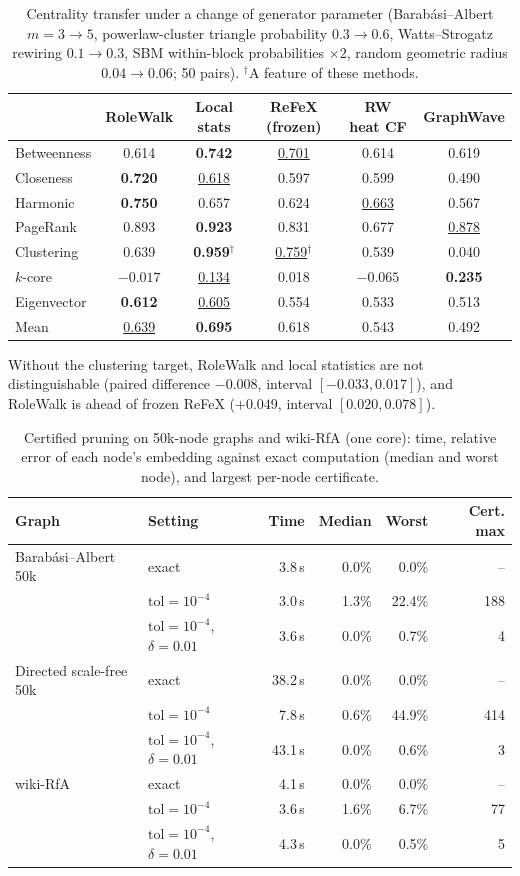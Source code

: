 \documentclass[10pt]{article}
\theoremstyle{definition}
\newcommand{\tol}{\mathrm{tol}}
\newcommand{\best}[1]{\textbf{#1}}
\newcommand{\second}[1]{\underline{#1}}
\begin{document}
\begin{table}[!ht]
\centering
\caption{Centrality transfer under a change of generator parameter (Barabási--Albert $m=3\to5$, powerlaw-cluster triangle probability $0.3\to0.6$, Watts--Strogatz rewiring $0.1\to0.3$, SBM within-block probabilities $\times2$, random geometric radius $0.04\to0.06$; 50 pairs). $^\dagger$A feature of these methods.}
\small
\begin{tabular}{lccccc}
\toprule
& RoleWalk & Local stats & ReFeX (frozen) & RW heat CF & GraphWave \\
\midrule
Betweenness & 0.614 & \best{0.742} & \second{0.701} & 0.614 & 0.619 \\
Closeness & \best{0.720} & \second{0.618} & 0.597 & 0.599 & 0.490 \\
Harmonic & \best{0.750} & 0.657 & 0.624 & \second{0.663} & 0.567 \\
PageRank & 0.893 & \best{0.923} & 0.831 & 0.677 & \second{0.878} \\
Clustering & 0.639 & \best{0.959}$^\dagger$ & \second{0.759}$^\dagger$ & 0.539 & 0.040 \\
$k$-core & $-0.017$ & \second{0.134} & 0.018 & $-0.065$ & \best{0.235} \\
Eigenvector & \best{0.612} & \second{0.605} & 0.554 & 0.533 & 0.513 \\
\midrule
Mean & \second{0.639} & \best{0.695} & 0.618 & 0.543 & 0.492 \\
\bottomrule
\end{tabular}
\end{table}
Without the clustering target, RoleWalk and local statistics are not distinguishable (paired difference $-0.008$, interval $[-0.033, 0.017]$), and RoleWalk is ahead of frozen ReFeX ($+0.049$, interval $[0.020, 0.078]$).

\begin{table}[!ht]
\centering
\caption{Certified pruning on 50k-node graphs and wiki-RfA (one core): time, relative error of each node's embedding against exact computation (median and worst node), and largest per-node certificate.}
\small
\begin{tabular}{llrrrr}
\toprule
Graph & Setting & Time & Median & Worst & Cert. max \\
\midrule
Barabási--Albert 50k & exact & 3.8\,s & 0.0\% & 0.0\% & -- \\
 & $\tol=10^{-4}$ & 3.0\,s & 1.3\% & 22.4\% & 188 \\
 & $\tol=10^{-4}$, $\delta=0.01$ & 3.6\,s & 0.0\% & 0.7\% & 4 \\
Directed scale-free 50k & exact & 38.2\,s & 0.0\% & 0.0\% & -- \\
 & $\tol=10^{-4}$ & 7.8\,s & 0.6\% & 44.9\% & 414 \\
 & $\tol=10^{-4}$, $\delta=0.01$ & 43.1\,s & 0.0\% & 0.6\% & 3 \\
wiki-RfA & exact & 4.1\,s & 0.0\% & 0.0\% & -- \\
 & $\tol=10^{-4}$ & 3.6\,s & 1.6\% & 6.7\% & 77 \\
 & $\tol=10^{-4}$, $\delta=0.01$ & 4.3\,s & 0.0\% & 0.5\% & 5 \\
\bottomrule
\end{tabular}
\end{table}
\end{document}
